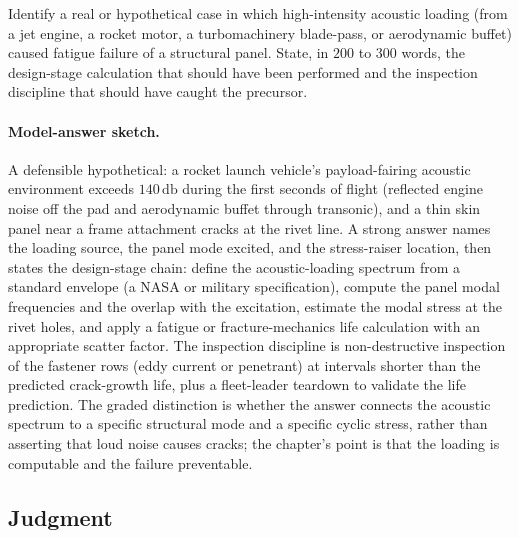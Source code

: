 \begin{exercise}
Identify a real or hypothetical case in which high-intensity
acoustic loading (from a jet engine, a rocket motor, a turbomachinery
blade-pass, or aerodynamic buffet) caused fatigue failure of a
structural panel. State, in $200$ to $300$ words, the design-stage
calculation that should have been performed and the inspection
discipline that should have caught the precursor.
\paragraph{Model-answer sketch.} A defensible hypothetical: a rocket
launch vehicle's payload-fairing acoustic environment exceeds
$140\,\si{\decibel}$ during the first seconds of flight (reflected
engine noise off the pad and aerodynamic buffet through transonic),
and a thin skin panel near a frame attachment cracks at the rivet line.
A strong answer names the loading source, the panel mode excited, and
the stress-raiser location, then states the design-stage chain: define
the acoustic-loading spectrum from a standard envelope (a NASA or
military specification), compute the panel modal frequencies and the
overlap with the excitation, estimate the modal stress at the rivet
holes, and apply a fatigue or fracture-mechanics life calculation with
an appropriate scatter factor. The inspection discipline is
non-destructive inspection of the fastener rows (eddy current or
penetrant) at intervals shorter than the predicted crack-growth life,
plus a fleet-leader teardown to validate the life prediction. The
graded distinction is whether the answer connects the acoustic
spectrum to a specific structural mode and a specific cyclic stress,
rather than asserting that loud noise causes cracks; the chapter's
point is that the loading is computable and the failure preventable.
\end{exercise}

\subsection*{Judgment}

